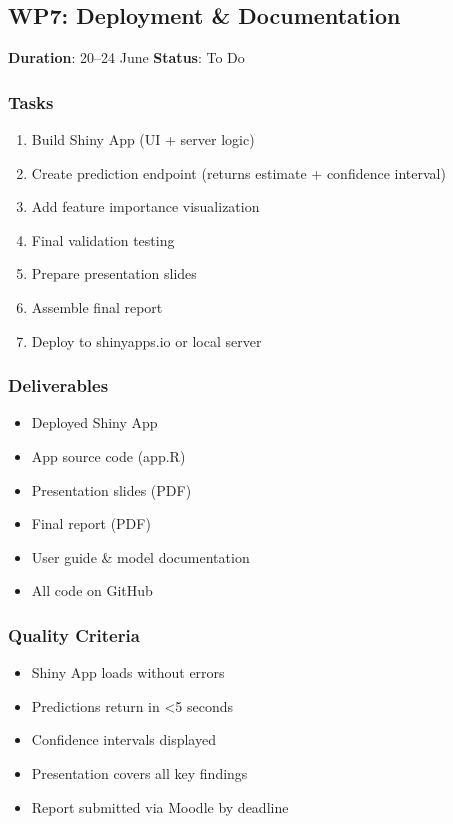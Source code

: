 \documentclass[
  english,
  letterpaper,
  DIV=11,
  numbers=noendperiod]{scrreprt}
\providecommand{\tightlist}{%
  \setlength{\itemsep}{0pt}\setlength{\parskip}{0pt}}
\begin{document}
\subsection{WP7: Deployment \&
Documentation}\label{wp7-deployment-documentation}

\textbf{Duration}: 20--24 June \textbar{} \textbf{Status}: To Do

\subsubsection{Tasks}\label{tasks-5}

\begin{enumerate}
\def\labelenumi{\arabic{enumi}.}
\tightlist
\item
  Build Shiny App (UI + server logic)
\item
  Create prediction endpoint (returns estimate + confidence interval)
\item
  Add feature importance visualization
\item
  Final validation testing
\item
  Prepare presentation slides
\item
  Assemble final report
\item
  Deploy to shinyapps.io or local server
\end{enumerate}

\subsubsection{Deliverables}\label{deliverables-7}

\begin{itemize}
\tightlist
\item
  Deployed Shiny App
\item
  App source code (app.R)
\item
  Presentation slides (PDF)
\item
  Final report (PDF)
\item
  User guide \& model documentation
\item
  All code on GitHub
\end{itemize}

\subsubsection{Quality Criteria}\label{quality-criteria-6}

\begin{itemize}
\tightlist
\item[$\square$]
  Shiny App loads without errors
\item[$\square$]
  Predictions return in \textless5 seconds
\item[$\square$]
  Confidence intervals displayed
\item[$\square$]
  Presentation covers all key findings
\item[$\square$]
  Report submitted via Moodle by deadline
\end{itemize}
\end{document}
